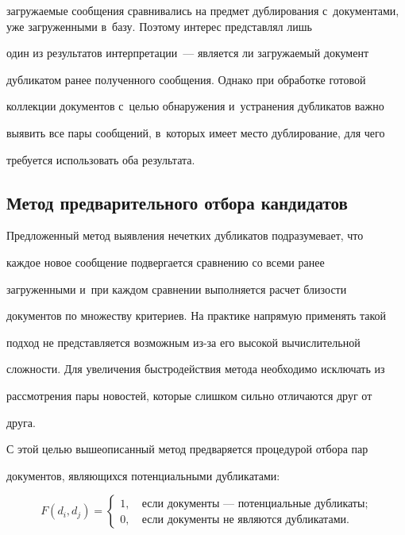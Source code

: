 загружаемые сообщения сравнивались на предмет дублирования с~документами, уже загруженными в~базу. Поэтому интерес представлял лишь

один из результатов интерпретации~--- является ли загружаемый документ

дубликатом ранее полученного сообщения. Однако при обработке готовой

коллекции документов с~целью обнаружения и~устранения дубликатов важно

выявить все пары сообщений, в~которых имеет место дублирование, для чего

требуется использовать оба результата.



\subsection{Метод предварительного отбора кандидатов}



  Предложенный метод выявления нечетких дубликатов подразумевает, что

каждое новое сообщение подвергается сравнению со всеми ранее

загруженными и~при каждом сравнении выполняется расчет близости

документов по множеству критериев. На практике напрямую применять такой

подход не представляется возможным из-за его высокой вычислительной

сложности. Для увеличения быстродействия метода необходимо исключать из

рассмотрения пары новостей, которые слишком сильно отличаются друг от

друга.

%

  С этой целью вышеописанный метод предваряется процедурой отбора пар

документов, являющихся потенциальными дубликатами:

  $$

  F(d_i,d_j)=\begin{cases}

  1, &\ \mbox{если документы~--- потенциальные дубликаты};\\

  0, &\ \mbox{если документы не являются дубликатами}.

  \end{cases}

  $$



